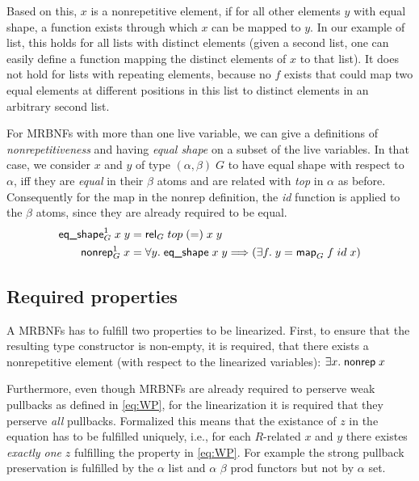     Based on this, $x$ is a nonrepetitive element, if for all other elements $y$ with equal shape, a function exists through which $x$ can be mapped to $y$. In our example of \textsf{list}, this holds for all lists with distinct elements (given a second list, one can easily define a function mapping the distinct elements of $x$ to that list). It does not hold for lists with repeating elements, because no $f$ exists that could map two equal elements at different positions in this list to distinct elements in an arbitrary second list.

    For \acp{MRBNF} with more than one live variable, we can give a definitions of \textit{nonrepetitiveness} and having \textit{equal shape} on a subset of the live variables. In that case, we consider $x$ and $y$ of type $(\alpha, \beta)\; G$ to have equal shape with respect to $\alpha$, iff they are \textit{equal} in their $\beta$ atoms and are related with \textit{top} in $\alpha$ as before. Consequently for the map in the \textsf{nonrep} definition, the \textit{id} function is applied to the $\beta$ atoms, since they are already required to be equal. 
    \begin{align}
      \text{\textsf{eq\_shape}}_G^1\; x\; y &= \text{\textsf{rel}}_G\; top\; (=)\; x\; y\\
      \text{\textsf{nonrep}}_G^1\; x &= \forall y.\; \text{\textsf{eq\_shape}}\; x\; y \Longrightarrow (\exists f.\; y = \text{\textsf{map}}_G\; f\; id\; x)
    \end{align}
    
    
  \subsection{Required properties}
    A \acp{MRBNF} has to fulfill two properties to be linearized. First, to ensure that the resulting type constructor is non-empty, it is required, that there exists a nonrepetitive element (with respect to the linearized variables): $\exists x.\; \text{\textsf{nonrep}}\; x$

    Furthermore, even though \acp{MRBNF} are already required to perserve weak pullbacks as defined in \autoref{eq:WP}, for the linearization it is required that they perserve \textit{all} pullbacks. Formalized this means that the existance of $z$ in the equation has to be fulfilled uniquely, i.e., for each $R$-related $x$ and $y$ there existes \textit{exactly one} $z$ fulfilling the property in \autoref{eq:WP}. For example the strong pullback preservation is fulfilled by the \textsf{$\alpha$ list} and \textsf{$\alpha$ $\beta$ prod} functors but not by \textsf{$\alpha$ set}. 

